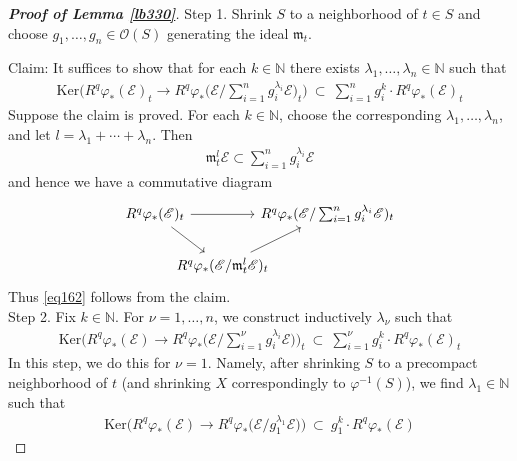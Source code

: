 \documentclass[12pt,b5paper,notitlepage]{report}
\theoremstyle{definition}
\theoremstyle{plain}
\newcommand{\scr}{\mathscr}
\newcommand{\Nbb}{\mathbb N}
\newcommand{\Ker}{\mathrm{Ker}}
\newcommand{\mk}{\mathfrak m}
\numberwithin{equation}{section}
\begin{document}
\begin{proof}[\textbf{Proof of Lemma \ref{lb330}}]
Step 1. Shrink $S$ to a neighborhood of $t\in S$ and choose $g_1,\dots,g_n\in\scr O(S)$ generating the ideal $\mk_t$. 

Claim: It suffices to show that for each $k\in\Nbb$ there exists $\lambda_1,\dots,\lambda_n\in\Nbb$ such that
\begin{align*}
\Ker\Big(R^q\varphi_*(\scr E)_t\rightarrow R^q\varphi_*\big(\scr E/\sum_{i=1}^ng_i^{\lambda_i}\scr E\big)_t \Big)~\subset~\sum_{i=1}^n g_i^k\cdot R^q\varphi_*(\scr E)_t
\end{align*}
Suppose the claim is proved. For each $k\in\Nbb$, choose the corresponding $\lambda_1,\dots,\lambda_n$, and let $l=\lambda_1+\cdots+\lambda_n$. Then
\begin{align*}
\mk_t^l\scr E\subset \sum_{i=1}^ng_i^{\lambda_i}\scr E
\end{align*}
and hence we have a commutative diagram
\begin{equation*}
\begin{tikzcd}[column sep=-0.5cm]
R^q\varphi_*(\scr E)_t \arrow[rr] \arrow[rd] &              & R^q\varphi_*(\scr E/\sum_{i=1}^ng_i^{\lambda_i}\scr E)_t \\
                        & R^q\varphi_*(\scr E/\mk_t^l\scr E)_t \arrow[ru] &  
\end{tikzcd}
\end{equation*}
Thus \eqref{eq162} follows from the claim.\\



Step 2. Fix $k\in\Nbb$. For $\nu=1,\dots,n$, we construct inductively $\lambda_\nu$ such that
\begin{align}
\Ker\Big(R^q\varphi_*(\scr E)\rightarrow R^q\varphi_*\big(\scr E/\sum_{i=1}^\nu g_i^{\lambda_i}\scr E\big) \Big)_t~\subset~\sum_{i=1}^\nu g_i^k\cdot R^q\varphi_*(\scr E)_t   \label{eq164}
\end{align}
In this step, we do this for $\nu=1$. Namely, after shrinking $S$ to a precompact neighborhood of $t$ (and shrinking $X$ correspondingly to $\varphi^{-1}(S)$), we  find $\lambda_1\in\Nbb$ such that
\begin{align}
\Ker\Big(R^q\varphi_*(\scr E)\rightarrow R^q\varphi_*\big(\scr E/ g_1^{\lambda_1}\scr E\big) \Big)~\subset~g_1^k\cdot R^q\varphi_*(\scr E)  \label{eq163}
\end{align}


\end{proof}
\end{document}

